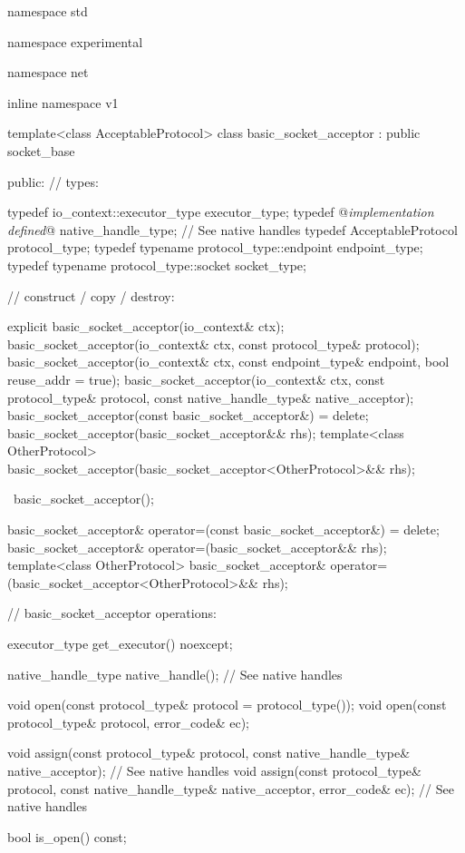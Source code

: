 \begin{codeblock}
namespace std {
namespace experimental {
namespace net {
inline namespace v1 {

  template<class AcceptableProtocol>
  class basic_socket_acceptor : public socket_base
  {
  public:
    // types:

    typedef io_context::executor_type executor_type;
    typedef @\textit{implementation defined}@ native_handle_type; // See native handles
    typedef AcceptableProtocol protocol_type;
    typedef typename protocol_type::endpoint endpoint_type;
    typedef typename protocol_type::socket socket_type;

    // construct / copy / destroy:

    explicit basic_socket_acceptor(io_context& ctx);
    basic_socket_acceptor(io_context& ctx, const protocol_type& protocol);
    basic_socket_acceptor(io_context& ctx, const endpoint_type& endpoint,
                          bool reuse_addr = true);
    basic_socket_acceptor(io_context& ctx, const protocol_type& protocol,
                          const native_handle_type& native_acceptor);
    basic_socket_acceptor(const basic_socket_acceptor&) = delete;
    basic_socket_acceptor(basic_socket_acceptor&& rhs);
    template<class OtherProtocol>
      basic_socket_acceptor(basic_socket_acceptor<OtherProtocol>&& rhs);

    ~basic_socket_acceptor();

    basic_socket_acceptor& operator=(const basic_socket_acceptor&) = delete;
    basic_socket_acceptor& operator=(basic_socket_acceptor&& rhs);
    template<class OtherProtocol>
      basic_socket_acceptor& operator=(basic_socket_acceptor<OtherProtocol>&& rhs);

    // basic_socket_acceptor operations:

    executor_type get_executor() noexcept;

    native_handle_type native_handle(); // See native handles

    void open(const protocol_type& protocol = protocol_type());
    void open(const protocol_type& protocol, error_code& ec);

    void assign(const protocol_type& protocol,
                const native_handle_type& native_acceptor); // See native handles
    void assign(const protocol_type& protocol,
                const native_handle_type& native_acceptor,
                error_code& ec); // See native handles

    bool is_open() const;

}}}}}
\end{codeblock}
